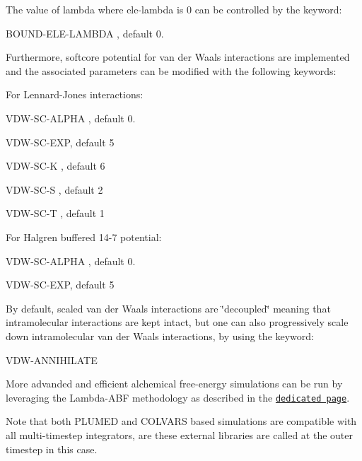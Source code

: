 The value of lambda where ele-\/lambda is 0 can be controlled by the keyword\-:
\begin{DoxyItemize}
\item B\-O\-U\-N\-D-\/\-E\-L\-E-\/\-L\-A\-M\-B\-D\-A , default 0.
\end{DoxyItemize}

Furthermore, softcore potential for van der Waals interactions are implemented and the associated parameters can be modified with the following keywords\-:

For Lennard-\/\-Jones interactions\-:
\begin{DoxyItemize}
\item V\-D\-W-\/\-S\-C-\/\-A\-L\-P\-H\-A , default 0.
\item V\-D\-W-\/\-S\-C-\/\-E\-X\-P, default 5
\item V\-D\-W-\/\-S\-C-\/\-K , default 6
\item V\-D\-W-\/\-S\-C-\/\-S , default 2
\item V\-D\-W-\/\-S\-C-\/\-T , default 1
\end{DoxyItemize}

For Halgren buffered 14-\/7 potential\-:
\begin{DoxyItemize}
\item V\-D\-W-\/\-S\-C-\/\-A\-L\-P\-H\-A , default 0.
\item V\-D\-W-\/\-S\-C-\/\-E\-X\-P, default 5
\end{DoxyItemize}

By default, scaled van der Waals interactions are \char`\"{}decoupled\char`\"{} meaning that intramolecular interactions are kept intact, but one can also progressively scale down intramolecular van der Waals interactions, by using the keyword\-:
\begin{DoxyItemize}
\item V\-D\-W-\/\-A\-N\-N\-I\-H\-I\-L\-A\-T\-E
\end{DoxyItemize}

More advanded and efficient alchemical free-\/energy simulations can be run by leveraging the Lambda-\/\-A\-B\-F methodology as described in the \href{md_lambda-abf_doxygen.html}{\tt dedicated page}.

Note that both P\-L\-U\-M\-E\-D and C\-O\-L\-V\-A\-R\-S based simulations are compatible with all multi-\/timestep integrators, are these external libraries are called at the outer timestep in this case. 